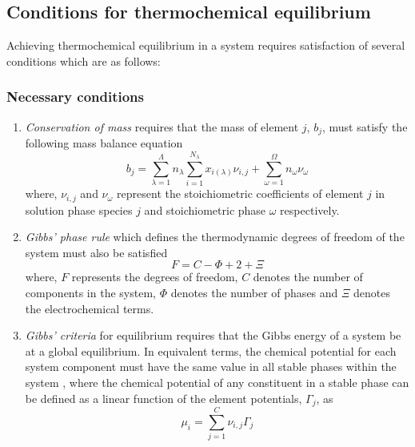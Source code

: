 \subsection*{Conditions for thermochemical equilibrium}
    	Achieving thermochemical equilibrium in a system requires satisfaction of several conditions which are as follows:
	\subsubsection{Necessary conditions}
    	\begin{enumerate}\compresslist
        		\item \emph{Conservation of mass} requires that the mass of element $j$, $b_j$, must satisfy the following mass balance equation 
            	\begin{equation*}
                		b_j = \sum_{\lambda=1}^{\Lambda} n_{\lambda}\sum_{i=1}^{N_{\lambda}}x_{i({\lambda})}{\nu}_{i,j} +  \sum_{\omega=1}^{\Omega} n_{\omega}{\nu}_{\omega}
            	\end{equation*}
            	where, ${\nu}_{i,j}$ and ${\nu}_{\omega}$ represent the stoichiometric coefficients of element $j$ in solution phase species $j$ and stoichiometric phase $\omega$ respectively.
        		\item \emph{Gibbs' phase rule} which defines the thermodynamic degrees of freedom of the system must also be     satisfied
            	\begin{equation*}
                		F=C-\Phi + 2 + \Xi
            	\end{equation*}
            	where, $F$ represents the degrees of freedom, $C$ denotes the number of components in the system, $\Phi$ denotes the number of phases and $\Xi$ denotes the electrochemical terms.
        		\item \emph{Gibbs' criteria} for equilibrium requires that the Gibbs energy of a system be at a global equilibrium. In equivalent terms, the chemical potential for each system component must have the same value in all stable phases within the system \cite{HILLERT198131}, where the chemical potential of any constituent in a stable phase can be defined as a linear function of the element potentials, $\Gamma_j$, as
            	\begin{equation*}
		        \mu_{i} = \sum_{j=1}^C \nu_{i,j} \Gamma_j                 
            	\end{equation*}
    	\end{enumerate}

